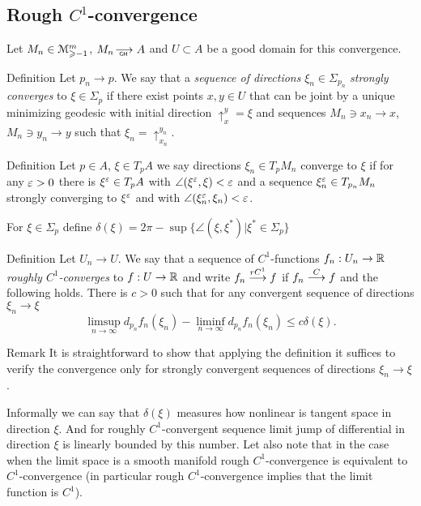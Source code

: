 \documentclass[a4paper,10pt]{article}
\begin{document}
 \subsection{Rough $C^1$-convergence }\label{sec:rC}
 Let   
 $M_n\in\mathcal M_{\geqslant -1}^m$,
 $M_n\GHto A$ 
 and  $U\subset A$ be a good domain for this convergence.
 

\begin{thm}{Definition}
	Let $p_n\to p$.
 We say that a \emph {sequence of directions} $\xi_n\in \Sigma_{p_n}$
 \emph{strongly converges} to $\xi\in\Sigma_{p}$ if there exist points
 $x,y\in U$ that can be joint by a unique minimizing geodesic
 with initial direction
 $\uparrow_{x}^{y}=\xi$ and sequences $M_n\ni x_n\to x$, 
 $M_n\ni y_n\to y$ such that
 $\xi_n=\uparrow_{x_n}^{y_n}$.
 \end{thm}
 
\begin{thm}{Definition}
Let $p\in A$, $\xi\in T_pA$
we say directions $\xi_n\in T_pM_n$
converge  to $\xi$
if for any $\varepsilon>0$ there is $\xi^\varepsilon\in T_pA$
with $\angle (\xi^\varepsilon, \xi)<\varepsilon$ and a sequence $\xi_n^\varepsilon\in T_{p_n}M_n$
strongly converging to $\xi^\varepsilon$ and with $\angle (\xi_n^\varepsilon, \xi_n)<\varepsilon$.

\end{thm}

 
 
 
 For $\xi\in\Sigma_p$ define $\delta(\xi)=2\pi-\sup\{\angle(\xi,\xi^*)|\xi^*\in\Sigma_p\}$
 
 \begin{thm}{Definition}
 	Let $U_n\to U$.
 We say that a sequence of 
 $C^1$-functions $f_n:U_n\to\mathbb{R}$ \emph{roughly
 $C^1$-converges}  to $f:U\to\mathbb{R}$
 and write $f_n\stackrel{ rC^{1}}{\longrightarrow} f$
 if $f_n\stackrel{C}{\longrightarrow} f$ and
 the following holds.
  There is   $c>0$
 such that for
 any %
  convergent
 sequence of directions
 $\xi_n\to \xi$
 $$\limsup_{n\to\infty} d_{p_n}f_n(\xi_n)-
 \liminf_{n\to\infty} d_{p_n}f_n(\xi_n)\le
 c\delta(\xi).
 $$
 \end{thm}
 
 \begin{thm}{Remark}
 It is straightforward to show that 
 applying the definition
   it suffices to verify the convergence
 only for strongly convergent sequences of directions  $\xi_n\to \xi$.
 \end{thm}
 
 
Informally we can say that $\delta(\xi)$ measures
 how nonlinear is tangent space in direction $\xi$.
 And for roughly $C^1$-convergent sequence
limit jump of differential in  direction $\xi$ is linearly bounded by
 this number. Let also note that in the case when the limit
 space is a smooth manifold rough
 $C^1$-convergence is equivalent to $C^1$-convergence 
 (in particular rough
 $C^1$-convergence implies that the limit function
 is $C^1$).
 
\end{document}
